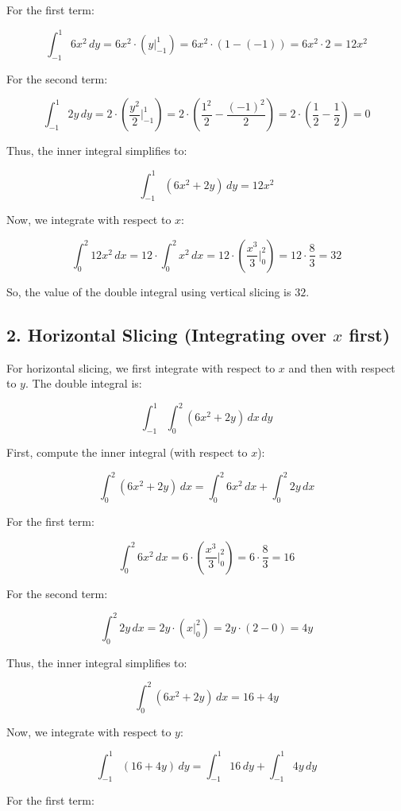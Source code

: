 \documentclass[11pt]{article}
\begin{document}
For the first term:

\[
\int_{-1}^1 6x^2 \, dy = 6x^2 \cdot (y \bigg|_{-1}^1) = 6x^2 \cdot (1 - (-1)) = 6x^2 \cdot 2 = 12x^2
\]

For the second term:

\[
\int_{-1}^1 2y \, dy = 2 \cdot \left( \frac{y^2}{2} \bigg|_{-1}^1 \right) = 2 \cdot \left( \frac{1^2}{2} - \frac{(-1)^2}{2} \right) = 2 \cdot ( \frac{1}{2} - \frac{1}{2} ) = 0
\]

Thus, the inner integral simplifies to:

\[
\int_{-1}^1 (6x^2 + 2y) \, dy = 12x^2
\]

Now, we integrate with respect to \(x\):

\[
\int_0^2 12x^2 \, dx = 12 \cdot \int_0^2 x^2 \, dx = 12 \cdot \left( \frac{x^3}{3} \bigg|_0^2 \right) = 12 \cdot \frac{8}{3} = 32
\]

So, the value of the double integral using vertical slicing is \( 32 \).

\newpage

\subsection{2. Horizontal Slicing (Integrating over \(x\) first)}

For horizontal slicing, we first integrate with respect to \(x\) and then with respect to \(y\). The double integral is:

\[
\int_{-1}^1 \int_0^2 (6x^2 + 2y) \, dx \, dy
\]

First, compute the inner integral (with respect to \(x\)):

\[
\int_0^2 (6x^2 + 2y) \, dx = \int_0^2 6x^2 \, dx + \int_0^2 2y \, dx
\]

For the first term:

\[
\int_0^2 6x^2 \, dx = 6 \cdot \left( \frac{x^3}{3} \bigg|_0^2 \right) = 6 \cdot \frac{8}{3} = 16
\]

For the second term:

\[
\int_0^2 2y \, dx = 2y \cdot (x \bigg|_0^2) = 2y \cdot (2 - 0) = 4y
\]

Thus, the inner integral simplifies to:

\[
\int_0^2 (6x^2 + 2y) \, dx = 16 + 4y
\]

Now, we integrate with respect to \(y\):

\[
\int_{-1}^1 (16 + 4y) \, dy = \int_{-1}^1 16 \, dy + \int_{-1}^1 4y \, dy
\]

For the first term:
\end{document}

